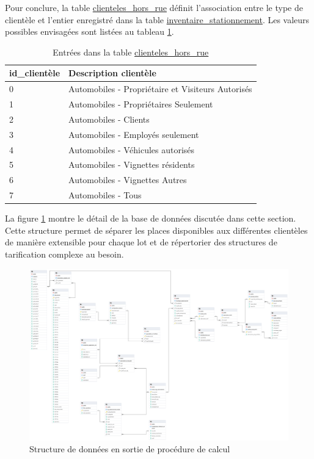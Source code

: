     Pour conclure, la table \underline{clienteles\_hors\_rue} définit l'association entre le type de clientèle et l'entier enregistré dans la table \underline{inventaire\_stationnement}. Les valeurs possibles envisagées sont listées au tableau \ref{tab:clienteles_hors_rue}.
    \begin{table}
    \centering
    \begin{tabular}{l l}
    \hline
    id\_clientèle & Description clientèle\\ \hline
    0& Automobiles - Propriétaire et Visiteurs Autorisés \\
    1 & Automobiles - Propriétaires Seulement \\
    2 & Automobiles - Clients \\
    3 & Automobiles - Employés seulement \\
    4 & Automobiles - Véhicules autorisés \\
    5 & Automobiles - Vignettes résidents \\
    6 & Automobiles - Vignettes Autres \\
    7 & Automobiles - Tous\\ \hline
    \end{tabular}
    \caption{Entrées dans la table \underline{clienteles\_hors\_rue}}\label{tab:clienteles_hors_rue}
    \end{table}
    \FloatBarrier
    La figure \ref{fig:offstreet_db_erd_output} montre le détail de la base de données discutée dans cette section. Cette structure permet de séparer les places disponibles aux différentes clientèles de manière extensible pour chaque lot et de répertorier des structures de tarification complexe au besoin.
    \begin{figure}[!h]
        \centering
        \includegraphics[trim={50cm 35cm 0 7cm}, clip, width=14cm]{images/structure_base_de_donnee.png}
        \caption{Structure de données en sortie de procédure de calcul}\label{fig:offstreet_db_erd_output}
    \end{figure}
    \FloatBarrier

